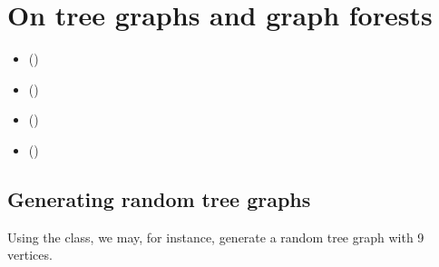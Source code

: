 \documentclass[a4paper,12pt,english]{sphinxhowto}
\begin{document}
\section{On tree graphs and graph forests}
\label{\detokenize{tutorial:on-tree-graphs-and-graph-forests}}\label{\detokenize{tutorial:trees-tutorial-label}}
\begin{sphinxShadowBox}
\begin{itemize}
\item {} 
\label{\detokenize{tutorial:id319}}{\hyperref[\detokenize{tutorial:generating-random-tree-graphs}]{}} ()

\item {} 
\label{\detokenize{tutorial:id320}}{\hyperref[\detokenize{tutorial:recognizing-tree-graphs}]{}} ()

\item {} 
\label{\detokenize{tutorial:id321}}{\hyperref[\detokenize{tutorial:spanning-trees-and-forests}]{}} ()

\item {} 
\label{\detokenize{tutorial:id322}}{\hyperref[\detokenize{tutorial:maximum-determined-spanning-forests}]{}} ()

\end{itemize}
\end{sphinxShadowBox}


\subsection{Generating random tree graphs}
\label{\detokenize{tutorial:generating-random-tree-graphs}}
Using the  class, we may, for instance, generate a random tree graph with 9 vertices.
\end{document}
